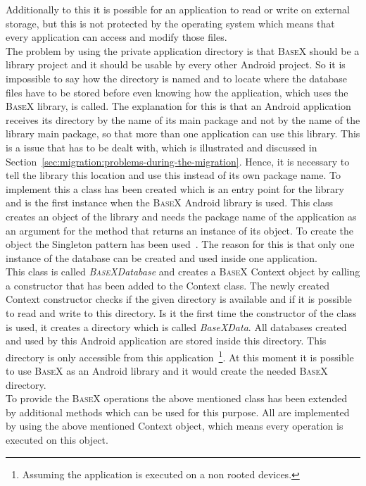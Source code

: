 Additionally to this it is possible for an application to read or write on external storage, but this is not protected by the operating system which means that every application can access and modify those files.\\
The problem by using the private application directory is that \textsc{BaseX} should be a library project and it should be usable by every other Android project.
So it is impossible to say how the directory is named and to locate where the database files have to be stored before even knowing how the application, which uses the \textsc{BaseX} library, is called.
The explanation for this is that an Android application receives its directory by the name of its main package and not by the name of the library main package, so that more than one application can use this library.
This is a issue that has to be dealt with, which is illustrated and discussed in Section~\ref{sec:migration:problems-during-the-migration}.
Hence, it is necessary to tell the library this location and use this instead of its own package name.
To implement this a class has been created which is an entry point for the library and is the first instance when the \textsc{BaseX} Android library is used.
This class creates an object of the library and needs the package name of the application as an argument for the method that returns an instance of its object.
To create the object the Singleton pattern has been used~\cite{gamma2010entwurfsmuster}.
The reason for this is that only one instance of the database can be created and used inside one application.\\
This class is called \textit{\textsc{BaseX}Database} and creates a \textsc{BaseX} Context object by calling a constructor that has been added to the Context class.
The newly created Context constructor checks if the given directory is available and if it is possible to read and write to this directory.
Is it the first time the constructor of the class is used, it creates a directory which is called \textit{BaseXData}.
All databases created and used by this Android application are stored inside this directory.
This directory is only accessible from this application~\footnote{Assuming the application is executed on a non rooted devices.}.
At this moment it is possible to use \textsc{BaseX} as an Android library and it would create the needed \textsc{BaseX} directory.\\
To provide the \textsc{BaseX} operations the above mentioned class has been extended by additional methods which can be used for this purpose.
All are implemented by using the above mentioned Context object, which means every operation is executed on this object.\\
